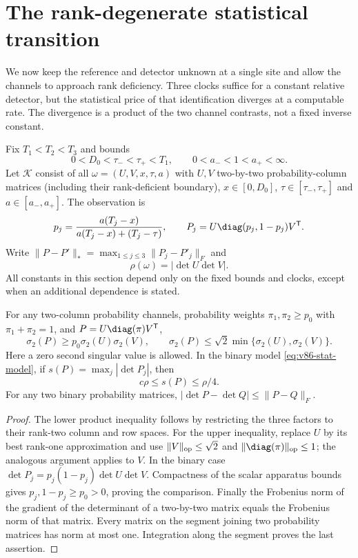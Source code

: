 \section{The rank-degenerate statistical transition}
\label{sec:v86-singular}
We now keep the reference and detector unknown at a single site and
allow the channels to approach rank deficiency. Three clocks suffice
for a constant relative detector, but the statistical price of that
identification diverges at a computable rate. The divergence is a
product of the two channel contrasts, not a fixed inverse constant.

Fix $T_1<T_2<T_3$ and bounds
\begin{equation}\label{eq:v86-stat-bounds}
 0<D_0<\tau_-<\tau_+<T_1,\qquad 0<a_-<1<a_+<\infty.
\end{equation}
Let $\mathcal K$ consist of all
$\omega=(U,V,x,\tau,a)$ with $U,V$ two-by-two probability-column
matrices (including their rank-deficient boundary),
$x\in[0,D_0]$, $\tau\in[\tau_-,\tau_+]$ and
$a\in[a_-,a_+]$. The observation is
\begin{equation}\label{eq:v86-stat-model}
 p_j=\frac{a(T_j-x)}{a(T_j-x)+(T_j-\tau)},\qquad
 P_j=U\diag(p_j,1-p_j)V^{\mathsf T}.
\end{equation}
Write $\|P-P'\|_* =\max_{1\le j\le3}\|P_j-P'_j\|_F$ and
\begin{equation}\label{eq:v86-rank-product}
             \rho(\omega)=|\det U\det V|.
\end{equation}
All constants in this section depend only on the fixed bounds and
clocks, except when an additional dependence is stated.

\begin{lemma}\label{lem:v86-rank}
For any two-column probability channels, probability weights
$\pi_1,\pi_2\ge p_0$ with $\pi_1+\pi_2=1$, and $P=U\diag(\pi)V^{\mathsf T}$,
\[
 \sigma_2(P)\ge p_0\sigma_2(U)\sigma_2(V),\qquad
 \sigma_2(P)\le\sqrt2\min\{\sigma_2(U),\sigma_2(V)\}.
\]
Here a zero second singular value is allowed. In the binary model
\eqref{eq:v86-stat-model}, if $s(P)=\max_j|\det P_j|$, then
\begin{equation}\label{eq:v86-observable-signal}
                 c\rho\le s(P)\le\rho/4.
\end{equation}
For any two binary probability matrices,
$|\det P-\det Q|\le\|P-Q\|_F$.
\end{lemma}
\begin{proof}
The lower product inequality follows by restricting the three factors
to their rank-two column and row spaces. For the upper inequality,
replace $U$ by its best rank-one approximation and use
$\|V\|_{\rm op}\le\sqrt2$ and $\|\diag(\pi)\|_{\rm op}\le1$;
the analogous argument applies to $V$. In the binary case
$\det P_j=p_j(1-p_j)\det U\det V$. Compactness of the scalar
apparatus bounds gives $p_j,1-p_j\ge p_0>0$, proving the comparison.
Finally the Frobenius norm of the gradient of the determinant of a
two-by-two matrix equals the Frobenius norm of that matrix. Every
matrix on the segment joining two probability matrices has norm at
most one. Integration along the segment proves the last assertion.
\end{proof}

